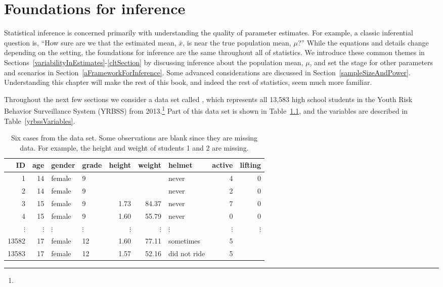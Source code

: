 \chapter{Foundations for inference}
\label{foundationsForInference}

Statistical inference is concerned primarily with understanding the quality of parameter estimates. For example, a classic inferential question is, ``How sure are we that the estimated mean, $\bar{x}$, is near the true population mean, $\mu$?'' While the equations and details change depending on the setting, the foundations for inference are the same throughout all of statistics. We introduce these common themes in Sections~\ref{variabilityInEstimates}-\ref{cltSection} by discussing inference about the population mean, $\mu$, and set the stage for other parameters and scenarios in Section~\ref{aFrameworkForInference}. Some advanced considerations are discussed in Section~\ref{sampleSizeAndPower}. Understanding this chapter will make the rest of this book, and indeed the rest of statistics, seem much more familiar.


Throughout the next few sections we consider a data set called , which represents all 13,583 high school students in the Youth Risk Behavior Surveillance System (YRBSS) from 2013.\footnote{} Part of this data set is shown in Table~\ref{yrbssDF}, and the variables are described in Table~\ref{yrbssVariables}.

\begin{table}[h]
\centering
\begin{tabular}{rrllrrlrr}
  \hline
ID & age & gender & grade & height & weight & helmet & active & lifting \\ 
  \hline
1 &  14 & female & 9 &  &  & never &   4 &   0 \\ 
  2 &  14 & female & 9 &  &  & never &   2 &   0 \\ 
  3 &  15 & female & 9 & 1.73 & 84.37 & never &   7 &   0 \\ 
  4 &  15 & female & 9 & 1.60 & 55.79 & never &   0 &   0 \\ 
  $\vdots$ & $\vdots$ & $\vdots$ & $\vdots$ & $\vdots$ & $\vdots$ & $\vdots$ & $\vdots$ & $\vdots$ \\
  13582 &  17 & female & 12 & 1.60 & 77.11 & sometimes &   5 &  \\ 
  13583 &  17 & female & 12 & 1.57 & 52.16 & did not ride &   5 &  \\ 
  \hline
\end{tabular}
\caption{Six cases from the  data set. Some observations are blank since they are missing data. For example, the height and weight of students 1 and 2 are missing.}
\label{yrbssDF}
\end{table}

